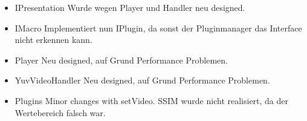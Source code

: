 \begin{itemize}
\item IPresentation \newline
Wurde wegen Player und Handler neu designed.
\item IMacro \newline
Implementiert nun IPlugin, da sonst der Pluginmanager das Interface nicht erkennen kann.
\item Player \newline
Neu designed, auf Grund Performance Problemen.
\item YuvVideoHandler \newline
Neu designed, auf Grund Performance Problemen.
\item Plugins \newline
Minor changes with setVideo. SSIM wurde nicht realisiert, da der Wertebereich falsch war.

\end{itemize}


